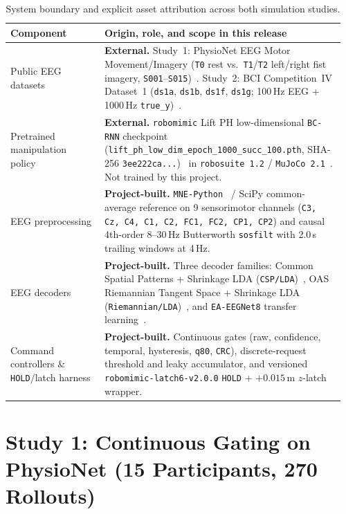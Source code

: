 \documentclass{article}
\begin{document}
\begin{table}[h]
\centering
\caption{System boundary and explicit asset attribution across both simulation studies.}
\label{tab:attribution}
\footnotesize
\begin{tabular}{@{}p{0.27\linewidth}p{0.69\linewidth}@{}}
\toprule
\textbf{Component} & \textbf{Origin, role, and scope in this release} \\
\midrule
Public EEG datasets & \textbf{External.} Study~1: PhysioNet EEG Motor Movement/Imagery (\texttt{T0} rest vs.\ \texttt{T1}/\texttt{T2} left/right fist imagery, \texttt{S001}--\texttt{S015})~\citep{schalk2009}. Study~2: BCI Competition~IV Dataset~1 (\texttt{ds1a}, \texttt{ds1b}, \texttt{ds1f}, \texttt{ds1g}; 100\,Hz EEG + 1000\,Hz \texttt{true\_y})~\citep{blankertz2007,tangermann2012}. \\
Pretrained manipulation policy & \textbf{External.} \texttt{robomimic} Lift PH low-dimensional \texttt{BC-RNN} checkpoint (\texttt{lift\_ph\_low\_dim\_epoch\_1000\_\allowbreak succ\_100.pth}, SHA-256 \texttt{3ee222ca...})~\citep{mandlekar2021} in \texttt{robosuite~1.2} / \texttt{MuJoCo~2.1}~\citep{zhu2020robosuite,todorov2012mujoco}. Not trained by this project. \\
EEG preprocessing & \textbf{Project-built.} \texttt{MNE-Python}~\citep{gramfort2013} / SciPy common-average reference on 9 sensorimotor channels (\texttt{C3, Cz, C4, C1, C2, FC1, FC2, CP1, CP2}) and causal 4th-order 8--30\,Hz Butterworth \texttt{sosfilt} with 2.0\,s trailing windows at 4\,Hz. \\
EEG decoders & \textbf{Project-built.} Three decoder families: Common Spatial Patterns + Shrinkage LDA (\texttt{CSP/LDA})~\citep{blankertz2008}, OAS Riemannian Tangent Space + Shrinkage LDA (\texttt{Riemannian/LDA})~\citep{barachant2012}, and \texttt{EA-EEGNet8} transfer learning~\citep{lawhern2018}. \\
Command controllers \& \texttt{HOLD}/latch harness & \textbf{Project-built.} Continuous gates (raw, confidence, temporal, hysteresis, \texttt{q80}, \texttt{CRC}), discrete-request threshold and leaky accumulator, and versioned \texttt{robomimic-latch6-v2.0.0} \texttt{HOLD} + $+0.015$\,m $z$-latch wrapper. \\
\bottomrule
\end{tabular}
\end{table}

\section{Study 1: Continuous Gating on PhysioNet (15 Participants, 270 Rollouts)}
\label{sec:study1}
\end{document}
